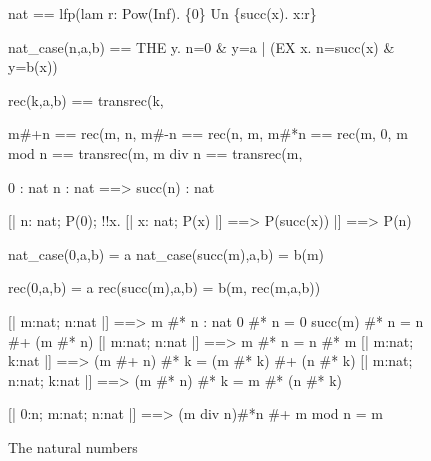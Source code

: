 \begin{figure}
\begin{ttbox}
       nat == lfp(lam r: Pow(Inf). \{0\} Un \{succ(x). x:r\}

  nat_case(n,a,b) == 
              THE y. n=0 & y=a | (EX x. n=succ(x) & y=b(x))

       rec(k,a,b) ==  
              transrec(k, %

       m#+n == rec(m, n, %
      m#-n == rec(n, m, %
      m#*n == rec(m, 0, %
       m mod n == transrec(m, %
       m div n == transrec(m, %

        0 : nat
     n : nat ==> succ(n) : nat

    [| n: nat;  P(0);  !!x. [| x: nat;  P(x) |] ==> P(succ(x)) 
    |] ==> P(n)

    nat_case(0,a,b) = a
 nat_case(succ(m),a,b) = b(m)

         rec(0,a,b) = a
      rec(succ(m),a,b) = b(m, rec(m,a,b))

     [| m:nat;  n:nat |] ==> m #* n : nat
        0 #* n = 0
     succ(m) #* n = n #+ (m #* n)
  [| m:nat;  n:nat |] ==> m #* n = n #* m
    [| m:nat;  k:nat |] ==> (m #+ n) #* k = (m #* k) #+ (n #* k)
    [| m:nat;  n:nat;  k:nat |] ==> (m #* n) #* k = m #* (n #* k)

    [| 0:n;  m:nat;  n:nat |] ==> (m div n)#*n #+ m mod n = m
\end{ttbox}
\caption{The natural numbers} \label{zf-nat}
\end{figure}

